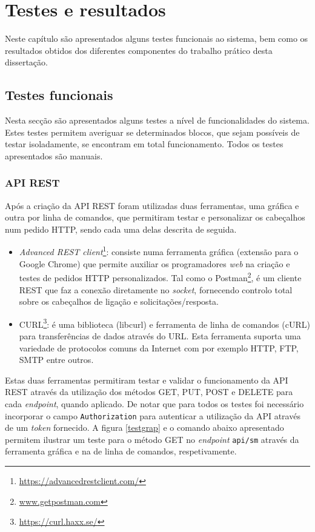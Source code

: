 \chapter{Testes e resultados}

Neste capítulo são apresentados alguns testes funcionais ao sistema, bem como os resultados obtidos dos diferentes componentes do trabalho prático desta dissertação. 

\section{Testes funcionais}


Nesta secção são apresentados alguns testes a nível de funcionalidades do sistema. Estes testes permitem averiguar se determinados blocos, que sejam possíveis de testar isoladamente, se encontram em total funcionamento. Todos os testes apresentados são manuais. 

\subsection{API REST}


Após a criação da \ac{API} \ac{REST} foram utilizadas duas ferramentas, uma gráfica e outra por linha de comandos, que permitiram testar e personalizar os cabeçalhos num pedido HTTP, sendo cada uma delas descrita de seguida.


\begin{itemize}
	\item \textit{Advanced REST client}\footnote{\url{https://advancedrestclient.com/}}: consiste numa ferramenta gráfica (extensão para o Google Chrome) que permite auxiliar os programadores \textit{web} na criação e testes de pedidos \ac{HTTP} personalizados. Tal como o Postman\footnote{\url{www.getpostman.com}}, é um cliente \ac{REST} que faz a conexão diretamente no \textit{socket}, fornecendo controlo total sobre os cabeçalhos de ligação e solicitações/resposta.
	 
	\item CURL\footnote{\url{https://curl.haxx.se/}}: é uma biblioteca (libcurl) e ferramenta de linha de comandos (cURL) para transferências de dados através do \ac{URL}. Esta ferramenta suporta uma variedade de protocolos comuns da Internet com por exemplo \ac{HTTP}, \ac{FTP}, \ac{SMTP} entre outros. 
\end{itemize}


Estas duas ferramentas permitiram testar e validar o funcionamento da API REST através da utilização dos métodos GET, PUT, POST e DELETE para cada \textit{endpoint}, quando aplicado. De notar que para todos os testes foi necessário incorporar o campo \texttt{Authorization} para autenticar a utilização da API através de um \textit{token} fornecido. A figura \ref{testgrap} e o comando abaixo apresentado permitem ilustrar um teste para o método GET no \textit{endpoint} \texttt{api/sm} através da ferramenta gráfica e na de linha de comandos, respetivamente. 






